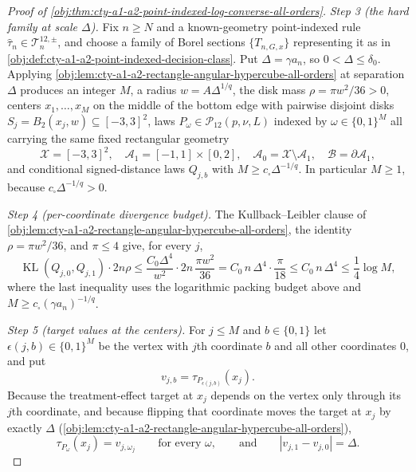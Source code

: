 \begin{proof}[Proof of \cref{obj:thm:cty-a1-a2-point-indexed-log-converse-all-orders}]
\emph{Step 3 (the hard family at scale \(\Delta\)).}
Fix \(n\geq N\) and a known-geometry point-indexed rule
\(\widehat\tau_n\in\mathcal T^{12,\pm}_n\), and choose a family of Borel
sections \(\{T_{n,G,x}\}\) representing it as in
\cref{obj:def:cty-a1-a2-point-indexed-decision-class}.  Put
\(\Delta=\gamma a_n\), so \(0<\Delta\leq\delta_0\).  Applying
\cref{obj:lem:cty-a1-a2-rectangle-angular-hypercube-all-orders} at separation
\(\Delta\) produces an integer \(M\), a radius \(w=A\Delta^{1/q}\), the disk
mass \(\rho=\pi w^2/36>0\), centers \(x_1,\ldots,x_M\) on the middle of the
bottom edge with pairwise disjoint disks \(S_j=B_2(x_j,w)\subseteq[-3,3]^2\),
laws \(P_\omega\in\mathcal P_{12}(p,\nu,L)\) indexed by \(\omega\in\{0,1\}^M\)
all carrying the same fixed rectangular geometry
\[
\mathcal X=[-3,3]^2,\quad
\mathcal A_1=[-1,1]\times[0,2],\quad
\mathcal A_0=\mathcal X\setminus\mathcal A_1,\quad
\mathcal B=\partial\mathcal A_1,
\]
and conditional signed-distance laws \(Q_{j,b}\) with
\(M\geq c_\square\Delta^{-1/q}\).  In particular \(M\geq 1\), because
\(c_\square\Delta^{-1/q}>0\).

\emph{Step 4 (per-coordinate divergence budget).}
The Kullback--Leibler clause of
\cref{obj:lem:cty-a1-a2-rectangle-angular-hypercube-all-orders}, the identity
\(\rho=\pi w^2/36\), and \(\pi\leq4\) give, for every \(j\),
\[
\operatorname{KL}(Q_{j,0},Q_{j,1})\cdot 2n\rho
\leq
\frac{C_0\Delta^4}{w^2}\cdot 2n\,\frac{\pi w^2}{36}
=
C_0\,n\,\Delta^4\cdot\frac{\pi}{18}
\leq
C_0\,n\,\Delta^4
\leq
\frac14\log M ,
\]
where the last inequality uses the logarithmic packing budget above and
\(M\geq c_\square(\gamma a_n)^{-1/q}\).

\emph{Step 5 (target values at the centers).}
For \(j\leq M\) and \(b\in\{0,1\}\) let \(\epsilon(j,b)\in\{0,1\}^M\) be the
vertex with \(j\)th coordinate \(b\) and all other coordinates \(0\), and put
\[
v_{j,b}=\tau_{P_{\epsilon(j,b)}}(x_j).
\]
Because the treatment-effect target at \(x_j\) depends on the vertex only
through its \(j\)th coordinate, and because flipping that coordinate moves the
target at \(x_j\) by exactly \(\Delta\)
(\cref{obj:lem:cty-a1-a2-rectangle-angular-hypercube-all-orders}),
\[
\tau_{P_\omega}(x_j)=v_{j,\omega_j}
\qquad\text{for every }\omega,
\qquad\text{and}\qquad
|v_{j,1}-v_{j,0}|=\Delta .
\]


\end{proof}
